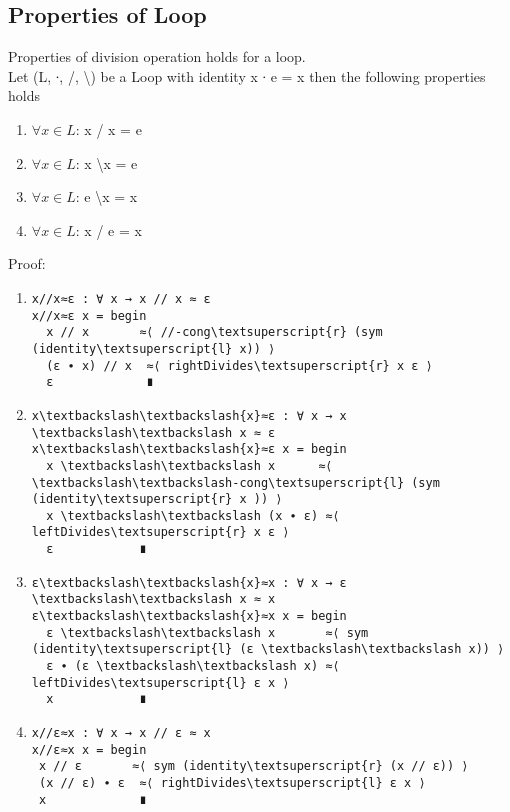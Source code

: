 \subsection{Properties of Loop}
Properties of division operation holds for a loop. \\
Let (L, ∙, /, \textbackslash ) be a Loop with identity x ∙ e = x then the following properties holds 
\begin{enumerate}
\item \(\forall x \in L\): x / x = e 
\item \(\forall x \in L\):  x \textbackslash x = e
\item \(\forall x \in L\): e \textbackslash x = x 
\item \(\forall x \in L\):  x / e = x 
\end{enumerate}
Proof:
\begin{enumerate}
\item 
\begin{Verbatim}[commandchars=\\\{\},samepage=true]
x//x≈ε : ∀ x → x // x ≈ ε
x//x≈ε x = begin
  x // x       ≈⟨ //-cong\textsuperscript{r} (sym (identity\textsuperscript{l} x)) ⟩
  (ε ∙ x) // x  ≈⟨ rightDivides\textsuperscript{r} x ε ⟩
  ε             ∎
\end{Verbatim}
\item
\begin{Verbatim}[commandchars=\\\{\},samepage=true]
x\textbackslash\textbackslash{x}≈ε : ∀ x → x \textbackslash\textbackslash x ≈ ε
x\textbackslash\textbackslash{x}≈ε x = begin
  x \textbackslash\textbackslash x      ≈⟨ \textbackslash\textbackslash-cong\textsuperscript{l} (sym (identity\textsuperscript{r} x )) ⟩
  x \textbackslash\textbackslash (x ∙ ε) ≈⟨ leftDivides\textsuperscript{r} x ε ⟩
  ε            ∎
\end{Verbatim}
\item
\begin{Verbatim}[commandchars=\\\{\},samepage=true]
ε\textbackslash\textbackslash{x}≈x : ∀ x → ε \textbackslash\textbackslash x ≈ x
ε\textbackslash\textbackslash{x}≈x x = begin
  ε \textbackslash\textbackslash x       ≈⟨ sym (identity\textsuperscript{l} (ε \textbackslash\textbackslash x)) ⟩
  ε ∙ (ε \textbackslash\textbackslash x) ≈⟨ leftDivides\textsuperscript{l} ε x ⟩
  x            ∎
\end{Verbatim}
\item
\begin{Verbatim}[commandchars=\\\{\},samepage=true]
x//ε≈x : ∀ x → x // ε ≈ x
x//ε≈x x = begin
 x // ε       ≈⟨ sym (identity\textsuperscript{r} (x // ε)) ⟩
 (x // ε) ∙ ε  ≈⟨ rightDivides\textsuperscript{l} ε x ⟩
 x             ∎
\end{Verbatim}
\end{enumerate}
